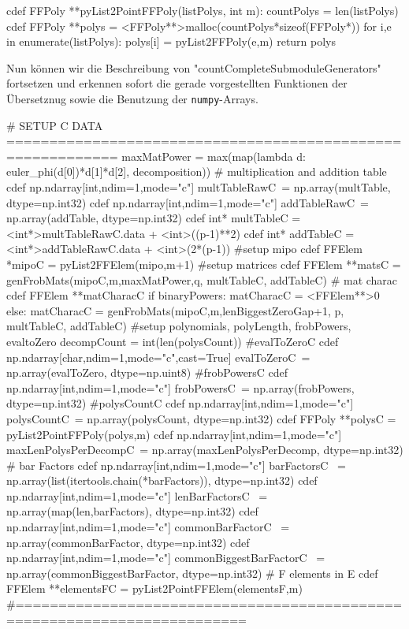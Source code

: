 \begin{sagecode}[caption={Aus \url{../Sage/enumeratePCNs.spyx}}]
cdef FFPoly **pyList2PointFFPoly(listPolys, int m):
    countPolys = len(listPolys)
    cdef FFPoly **polys = <FFPoly**>malloc(countPolys*sizeof(FFPoly*))
    for i,e in enumerate(listPolys):
        polys[i] = pyList2FFPoly(e,m)
    return polys
\end{sagecode}


Nun können wir die Beschreibung von "countCompleteSubmoduleGenerators"
fortsetzen und erkennen sofort die gerade vorgestellten Funktionen der
Übersetznug sowie die Benutzung der \texttt{numpy}-Arrays.

\begin{sagecode}[caption={\texttt{countCompleteSubmoduleGenerators}
  Fortsetzung (III)}]
    # SETUP C DATA ===========================================================
    maxMatPower = max(map(lambda d: euler_phi(d[0])*d[1]*d[2], decomposition))
        # multiplication and addition table
    cdef np.ndarray[int,ndim=1,mode="c"] multTableRawC\
        = np.array(multTable, dtype=np.int32)
    cdef np.ndarray[int,ndim=1,mode="c"] addTableRawC\
        = np.array(addTable, dtype=np.int32)
    cdef int* multTableC = <int*>multTableRawC.data + <int>((p-1)**2)
    cdef int* addTableC = <int*>addTableRawC.data + <int>(2*(p-1))
        #setup mipo
    cdef FFElem *mipoC = pyList2FFElem(mipo,m+1)
       #setup matrices
    cdef FFElem **matsC  = genFrobMats(mipoC,m,maxMatPower,q,
            multTableC, addTableC)
        # mat charac
    cdef FFElem **matCharacC
    if binaryPowers:
        matCharacC = <FFElem**>0
    else:
        matCharacC = genFrobMats(mipoC,m,lenBiggestZeroGap+1,
                p, multTableC, addTableC)
    #setup polynomials, polyLength, frobPowers, evaltoZero
    decompCount = int(len(polysCount))
        #evalToZeroC
    cdef np.ndarray[char,ndim=1,mode="c",cast=True] evalToZeroC\
            = np.array(evalToZero, dtype=np.uint8)
        #frobPowersC
    cdef np.ndarray[int,ndim=1,mode="c"] frobPowersC\
            = np.array(frobPowers, dtype=np.int32)
        #polysCountC
    cdef np.ndarray[int,ndim=1,mode="c"] polysCountC\
            = np.array(polysCount, dtype=np.int32)
    cdef FFPoly **polysC = pyList2PointFFPoly(polys,m)
    cdef np.ndarray[int,ndim=1,mode="c"] maxLenPolysPerDecompC\
            = np.array(maxLenPolysPerDecomp, dtype=np.int32)
        # bar Factors
    cdef np.ndarray[int,ndim=1,mode="c"] barFactorsC \
        = np.array(list(itertools.chain(*barFactors)), dtype=np.int32)
    cdef np.ndarray[int,ndim=1,mode="c"] lenBarFactorsC \
        = np.array(map(len,barFactors), dtype=np.int32)
    cdef np.ndarray[int,ndim=1,mode="c"] commonBarFactorC \
        = np.array(commonBarFactor, dtype=np.int32)
    cdef np.ndarray[int,ndim=1,mode="c"] commonBiggestBarFactorC \
        = np.array(commonBiggestBarFactor, dtype=np.int32)
        # F elements in E
    cdef FFElem **elementsFC = pyList2PointFFElem(elementsF,m)
    #=========================================================================
\end{sagecode}

